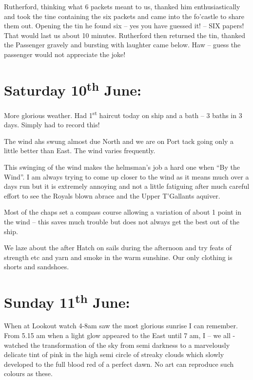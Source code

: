 \documentclass[
  11pt,
  msmallroyalvopaper
]{memoir}
\begin{document}
Rutherford, thinking what 6 packets meant to us, thanked him
enthusiastically and took the tine containing the six packets and came
into the fo'castle to share them out. Opening the tin he found six --
yes you have guessed it! -- SIX papers! That would last us about 10
minutes. Rutherford then returned the tin, thanked the Passenger gravely
and bursting with laughter came below. Haw -- guess the passenger would
not appreciate the joke!

\hypertarget{saturday-10th-june}{%
\section{\texorpdfstring{Saturday 10\textsuperscript{th}
June:}{Saturday 10th June:}}\label{saturday-10th-june}}

More glorious weather. Had 1\textsuperscript{st} haircut today on ship
and a bath -- 3 baths in 3 days. Simply had to record this!

The wind ahs swung almost due North and we are on Port tack going only a
little better than East. The wind varies frequently.

This swinging of the wind makes the helmsman's job a hard one when ``By
the Wind''. I am always trying to come up closer to the wind as it means
much over a days run but it is extremely annoying and not a little
fatiguing after much careful effort to see the Royals blown abrace and
the Upper T'Gallants aquiver.

Most of the chaps set a compass course allowing a variation of about 1
point in the wind -- this saves much trouble but does not always get the
best out of the ship.

We laze about the after Hatch on sails during the afternoon and try
feats of strength etc and yarn and smoke in the warm sunshine. Our only
clothing is shorts and sandshoes.

\hypertarget{sunday-11th-june}{%
\section{\texorpdfstring{Sunday 11\textsuperscript{th}
June:}{Sunday 11th June:}}\label{sunday-11th-june}}

When at Lookout watch 4-8am saw the most glorious sunrise I can
remember. From 5.15 am when a light glow appeared to the East until 7
am, I -- we all - watched the transformation of the sky from semi
darkness to a marvelously delicate tint of pink in the high semi circle
of streaky clouds which slowly developed to the full blood red of a
perfect dawn. No art can reproduce such colours as these.
\end{document}
